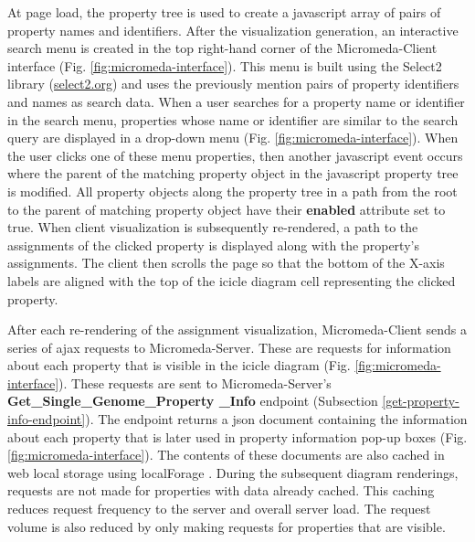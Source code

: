 At page load, the property tree is used to create a \gls{javascript} array of pairs of property names and identifiers. After the visualization generation, an interactive search menu is created in the top right-hand corner of the Micromeda-Client interface (Fig. \ref{fig:micromeda-interface}). This menu is built using the Select2 library \cite{select2} (\href{http://select2.org}{select2.org}) and uses the previously mention pairs of property identifiers and names as search data. When a user searches for a property name or identifier in the search menu, properties whose name or identifier are similar to the search query are displayed in a drop-down menu (Fig. \ref{fig:micromeda-interface}). When the user clicks one of these menu properties, then another \gls{javascript} event occurs where the parent of the matching property object in the \gls{javascript} property tree is modified. All property objects along the property tree in a path from the root to the parent of matching property object have their \textbf{enabled} attribute set to true. When client visualization is subsequently re-rendered, a path to the assignments of the clicked property is displayed along with the property's assignments. The client then scrolls the page so that the bottom of the X-axis labels are aligned with the top of the icicle diagram cell representing the clicked property.

After each re-rendering of the assignment visualization, Micromeda-Client sends a series of \gls{ajax}  requests to Micromeda-Server. These are requests for information about each property that is visible in the icicle diagram (Fig. \ref{fig:micromeda-interface}). These requests are sent to Micromeda-Server's \textbf{Get\_Single\_Genome\_Property \_Info} endpoint (Subsection \ref{get-property-info-endpoint}). The endpoint returns a \gls{json} document containing the information about each property that is later used in property information pop-up boxes (Fig. \ref{fig:micromeda-interface}). The contents of these documents are also cached in web local storage using localForage \cite{localforage}. During the subsequent diagram renderings, requests are not made for properties with data already cached. This caching reduces request frequency to the server and overall server load. The request volume is also reduced by only making requests for properties that are visible.

